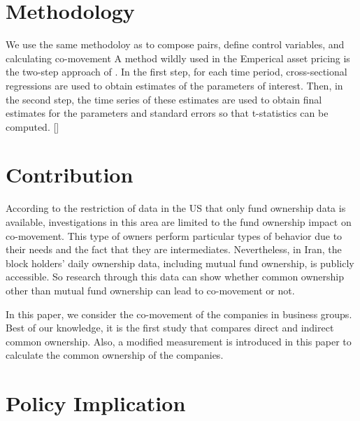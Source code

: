 \documentclass[12pt, a4paper]{article}
\begin{document}
\section*{Methodology}
We use the same methodoloy as  \cite{AntonPolk} to compose pairs, define control variables, and calculating co-movement
A method wildly used in the Emperical asset pricing is the two-step approach of \cite{FamaMacBeth}. In the first step, for each time period, cross-sectional regressions
are used to obtain estimates of the parameters of interest. Then, in the second step, the time series
of these estimates are used to obtain final estimates for the parameters and standard errors so that
t-statistics can be computed. [\cite{skoulakis2008panel}] 


\section*{Contribution}
According to the restriction of data in the US that only fund ownership data is available, investigations in this area are limited to the fund ownership impact on co-movement. This type of owners perform particular types of behavior due to their needs and the fact that they are intermediates.
	Nevertheless, in Iran, the block holders' daily ownership data, including mutual fund ownership, is publicly accessible. So research through this data can show whether common ownership other than mutual fund ownership can lead to co-movement or not.

	
		In this paper, we consider the co-movement of the companies in business groups. Best of our knowledge, it is the first study that compares direct and indirect common ownership. Also, a modified measurement is introduced in this paper to calculate the common ownership of the companies. 

\section*{Policy Implication}











	


	
\newpage
	{
	\footnotesize
	
	
}
\end{document}
